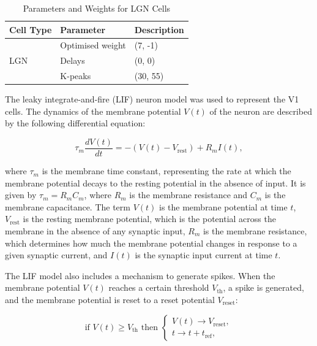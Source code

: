 \documentclass[12pt]{article}
\begin{document}
\begin{table}[H]
  \centering
  \caption{Parameters and Weights for LGN Cells}
  \begin{tabular}{lll}
  \toprule
  \textbf{Cell Type} & \textbf{Parameter} & \textbf{Description} \\
  \midrule
  \multirow{4}{*}{LGN} 
      & Optimised weight      & (7, -1) \\
      & Delays   & (0, 0) \\
      & K-peaks   & (30, 55) \\
  \bottomrule
  \end{tabular}
\end{table}

The leaky integrate-and-fire (LIF) neuron model was used to represent the V1 cells. The dynamics of the membrane potential \(V(t)\) of the neuron are described by the following differential equation:

\begin{equation}
\tau_m \frac{dV(t)}{dt} = - (V(t) - V_{\text{rest}}) + R_m I(t),
\label{eq:LIF}
\end{equation}

where \(\tau_m\) is the membrane time constant, representing the rate at which the membrane potential decays to the resting potential in the absence of input. It is given by \(\tau_m = R_m C_m\), where \(R_m\) is the membrane resistance and \(C_m\) is the membrane capacitance. The term \(V(t)\) is the membrane potential at time \(t\), \(V_{\text{rest}}\) is the resting membrane potential, which is the potential across the membrane in the absence of any synaptic input, \(R_m\) is the membrane resistance, which determines how much the membrane potential changes in response to a given synaptic current, and \(I(t)\) is the synaptic input current at time \(t\).

The LIF model also includes a mechanism to generate spikes. When the membrane potential \(V(t)\) reaches a certain threshold \(V_{\text{th}}\), a spike is generated, and the membrane potential is reset to a reset potential \(V_{\text{reset}}\):

\begin{equation}
\text{if } V(t) \geq V_{\text{th}} \text{ then } \begin{cases}
V(t) \rightarrow V_{\text{reset}}, \\
t \rightarrow t + t_{\text{ref}},
\end{cases}
\end{equation}
\end{document}
